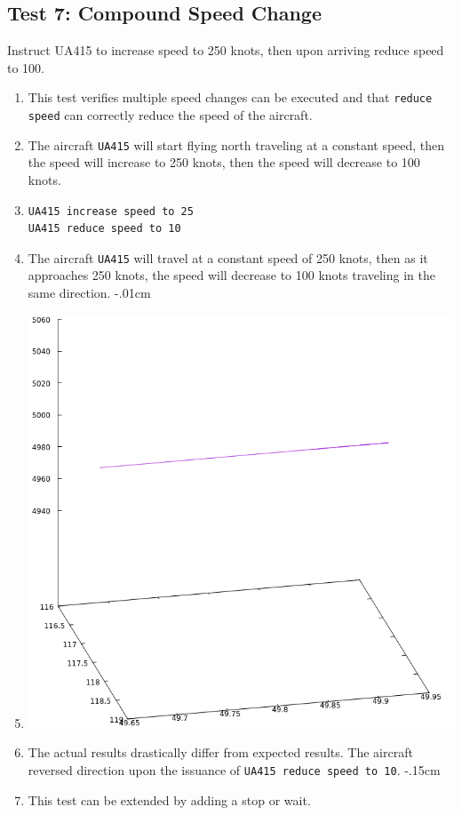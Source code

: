 \documentclass[letterpaper, 12pt]{article}
\begin{document}
\subsection{Test 7: Compound Speed Change}
Instruct UA415 to increase speed to 250 knots, then upon arriving reduce speed to 100.
\begin{enumerate}\itemsep-.15cm
\item This test verifies multiple speed changes can be executed and that \verb!reduce speed! can correctly reduce the speed of the aircraft.
\item The aircraft \verb!UA415! will start flying north traveling at a constant speed, then the speed will increase to 250 knots, then the speed will decrease to 100 knots.
\item \begin{verbatim}
UA415 increase speed to 25
UA415 reduce speed to 10
\end{verbatim}
\item The aircraft \verb!UA415! will travel at a constant speed of 250 knots, then as it approaches 250 knots, the speed will decrease to 100 knots traveling in the same direction.
\itemsep-.01cm
\item \includegraphics[scale=.4,valign=t,center]{test7.png}
\item The actual results drastically differ from expected results. The aircraft reversed direction upon the issuance of \verb!UA415 reduce speed to 10!.
\itemsep-.15cm
\item This test can be extended by adding a stop or wait.
\end{enumerate}
\end{document}
